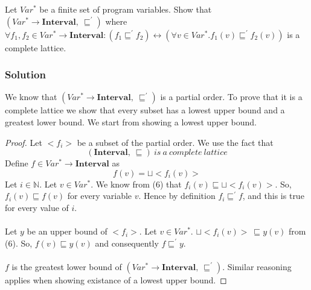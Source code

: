Let $Var^*$ be a finite set of program variables.
Show that $(Var^* \rightarrow \mathbf{Interval},\ \sqsubseteq^{'})$ where $\forall f_1,f_2 \in Var^* \rightarrow \mathbf{Interval}:(f_1\sqsubseteq^{'}f_2)\longleftrightarrow (\forall v \in Var^*. f_1(v)\sqsubseteq^{'}f_2(v))$ is a complete lattice. 

\subsubsection*{Solution}
We know that $(Var^* \rightarrow \mathbf{Interval},\ \sqsubseteq^{'})$ is a partial order. To prove that it is a complete lattice we show that every subset has a lowest upper bound and a greatest lower bound. We start from showing a lowest upper bound.
\begin{proof}
	Let $<f_i>$ be a subset of the partial order.
	We use the fact that
	\begin{equation}
	(\mathbf{Interval},\ \sqsubseteq)\ is\ a\ complete\ lattice
	\end{equation}
	Define $f \in Var^* \rightarrow \mathbf{Interval}$ as
	\begin{equation*}
	f(v)=\sqcup <f_i(v)>
	\end{equation*}
	Let $i \in \mathbb{N}$. Let $v \in Var^*$. We know from (6) that $f_i(v)\sqsubseteq \sqcup<f_i(v)>$. So, $f_i(v)\sqsubseteq f(v)$ for every variable $v$. Hence by definition $f_i\sqsubseteq^{'}f$, and this is true for every value of $i$.\\ \\
	Let $y$ be an upper bound of $<f_i>$. Let $v \in Var^*$. $\sqcup<f_i(v)>\ \sqsubseteq y(v)$ from (6). So, $f(v)\sqsubseteq y(v)$ and consequently $f\sqsubseteq^{'}y$.\\ \\
	$f$ is the greatest lower bound of $(Var^* \rightarrow \mathbf{Interval},\ \sqsubseteq^{'})$. Similar reasoning applies when showing existance of a lowest upper bound.
\end{proof}